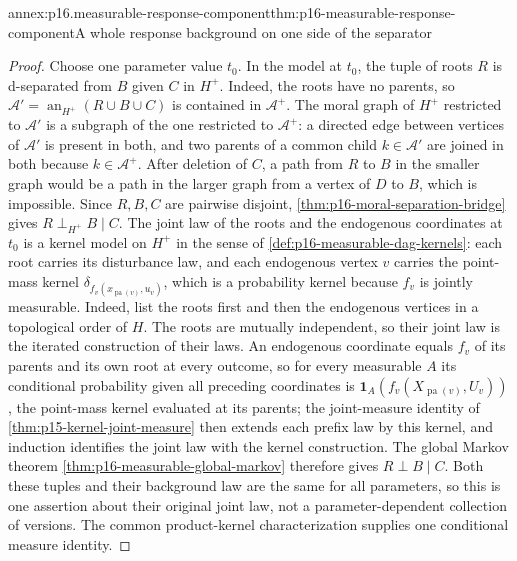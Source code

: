 \begin{annexitem}{annex:p16.measurable-response-component}{thm:p16-measurable-response-component}{A whole response background on one side of the separator}
\begin{proof}
Choose one parameter value \(t_0\). In the model at \(t_0\),
the tuple of roots \(R\) is d-separated from \(B\) given \(C\) in
\(H^+\). Indeed, the roots have no parents, so
\(\mathcal A'=\operatorname{an}_{H^+}(R\cup B\cup C)\) is contained in
\(\mathcal A^+\). The moral graph of \(H^+\) restricted to
\(\mathcal A'\) is a subgraph of the one restricted to \(\mathcal A^+\):
a directed edge between vertices of \(\mathcal A'\) is present in both,
and two parents of a common child \(k\in\mathcal A'\) are joined in both
because \(k\in\mathcal A^+\). After deletion of \(C\), a path from \(R\)
to \(B\) in the smaller graph would be a path in the larger graph from a
vertex of \(D\) to \(B\), which is impossible. Since \(R,B,C\) are
pairwise disjoint, \cref{thm:p16-moral-separation-bridge} gives
\(R\mathrel{\perp_{H^+}}B\mid C\). The joint law of the roots and the
endogenous coordinates at \(t_0\) is a kernel model on \(H^+\) in the
sense of \cref{def:p16-measurable-dag-kernels}: each root carries its
disturbance law, and each endogenous vertex \(v\) carries the point-mass
kernel \(\delta_{f_v(x_{\operatorname{pa}(v)},u_v)}\), which is a
probability kernel because \(f_v\) is jointly measurable. Indeed, list
the roots first and then the endogenous vertices in a topological order
of \(H\). The roots are mutually independent, so their joint law is the
iterated construction of their laws. An endogenous coordinate equals
\(f_v\) of its parents and its own root at every outcome, so for every
measurable \(A\) its conditional probability given all preceding
coordinates is \(\mathbf 1_A(f_v(X_{\operatorname{pa}(v)},U_v))\), the
point-mass kernel evaluated at its parents; the joint-measure identity
of \cref{thm:p15-kernel-joint-measure} then extends each prefix law by
this kernel, and induction identifies the joint law with the kernel
construction. The global Markov theorem
\cref{thm:p16-measurable-global-markov} therefore gives
\(R\perp B\mid C\). Both these
tuples and their background law are the same for all parameters,
so this is one assertion about their original joint law, not a
parameter-dependent collection of versions. The common product-kernel
characterization supplies one conditional measure identity.


\end{proof}
\end{annexitem}
